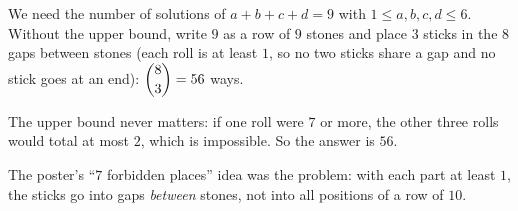 We need the number of solutions of $a+b+c+d=9$ with $1\le a,b,c,d\le 6$. Without the upper bound, write $9$ as a row of $9$ stones and place $3$ sticks in the $8$ gaps between stones (each roll is at least $1$, so no two sticks share a gap and no stick goes at an end): $\dbinom83=56$ ways.

The upper bound never matters: if one roll were $7$ or more, the other three rolls would total at most $2$, which is impossible. So the answer is $\boxed{56}$.

The poster's ``$7$ forbidden places'' idea was the problem: with each part at least $1$, the sticks go into gaps \emph{between} stones, not into all positions of a row of $10$.
